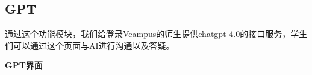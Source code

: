 \documentclass{article}
\begin{document}
\subsection{GPT}
通过这个功能模块，我们给登录Vcampus的师生提供chatgpt-4.0的接口服务，学生们可以通过这个页面与AI进行沟通以及答疑。
\begin{center}
\textbf{GPT界面}
\end{center}
\end{document}
